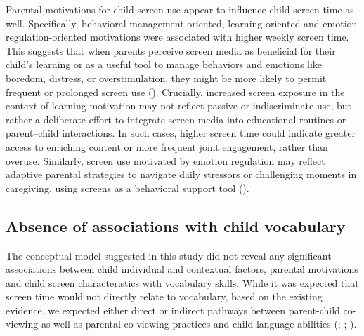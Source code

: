 \documentclass[
  man,
  floatsintext,
  longtable,
  nolmodern,
  notxfonts,
  notimes,
  colorlinks=true,linkcolor=blue,citecolor=blue,urlcolor=blue]{apa7}
\begin{document}
Parental motivations for child screen use appear to influence child
screen time as well. Specifically, behavioral management-oriented,
learning-oriented and emotion regulation-oriented motivations were
associated with higher weekly screen time. This suggests that when
parents perceive screen media as beneficial for their child's learning
or as a useful tool to manage behaviors and emotions like boredom,
distress, or overstimulation, they might be more likely to permit
frequent or prolonged screen use
().
Crucially, increased screen exposure in the context of learning
motivation may not reflect passive or indiscriminate use, but rather a
deliberate effort to integrate screen media into educational routines or
parent--child interactions. In such cases, higher screen time could
indicate greater access to enriching content or more frequent joint
engagement, rather than overuse. Similarly, screen use motivated by
emotion regulation may reflect adaptive parental strategies to navigate
daily stressors or challenging moments in caregiving, using screens as a
behavioral support tool
().

\subsection{Absence of associations with child
vocabulary}\label{absence-of-associations-with-child-vocabulary}

The conceptual model suggested in this study did not reveal any
significant associations between child individual and contextual
factors, parental motivations and child screen characteristics with
vocabulary skills. While it was expected that screen time would not
directly relate to vocabulary, based on the existing evidence, we
expected either direct or indirect pathways between parent-child
co-viewing as well as parental co-viewing practices and child language
abilities (;
; ).
\end{document}
